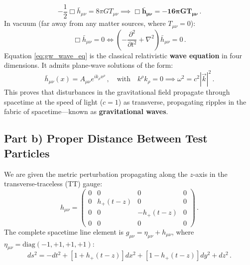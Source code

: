\documentclass[12pt]{article}
\newcommand{\be}{\begin{equation}}
\newcommand{\ee}{\end{equation}}
\begin{document}
\be
- \frac{1}{2} \Box \bar h_{\mu\nu} = 8\pi G T_{\mu\nu} \implies \mathbf{\Box \bar h_{\mu\nu} = - 16\pi G T_{\mu\nu}} \,.
\ee
In vacuum (far away from any matter sources, where $T_{\mu\nu} = 0$):
\be
\Box \bar h_{\mu\nu} = 0 \iff \left( - \frac{\partial^2}{\partial t^2} + \nabla^2 \right) \bar h_{\mu\nu} = 0 \,.
\label{eq:gw_wave_eq}
\ee
Equation \eqref{eq:gw_wave_eq} is the classical relativistic \textbf{wave equation} in four dimensions. It admits plane-wave solutions of the form:
\be
\bar h_{\mu\nu}(x) = A_{\mu\nu} e^{i k_\rho x^\rho} \,, \quad \text{with} \quad k^\rho k_\rho = 0 \implies \omega^2 = c^2 |\vec k|^2 \,.
\ee
This proves that disturbances in the gravitational field propagate through spacetime at the speed of light ($c=1$) as transverse, propagating ripples in the fabric of spacetime---known as \textbf{gravitational waves}.

\subsection*{Part b) Proper Distance Between Test Particles}

We are given the metric perturbation propagating along the $z$-axis in the transverse-traceless (TT) gauge:
\be
h_{\mu\nu} = \begin{pmatrix}
0 & 0 & 0 & 0 \\
0 & h_{+}(t-z) & 0 & 0 \\
0 & 0 & - h_{+}(t-z) & 0 \\
0 & 0 & 0 & 0
\end{pmatrix} \,.
\ee
The complete spacetime line element is $g_{\mu\nu} = \eta_{\mu\nu} + h_{\mu\nu}$, where $\eta_{\mu\nu} = \text{diag}(-1, +1, +1, +1)$:
\be
ds^2 = - dt^2 + \left[ 1 + h_+(t-z) \right] dx^2 + \left[ 1 - h_+(t-z) \right] dy^2 + dz^2 \,.
\label{eq:tt_line_element}
\ee
\end{document}

